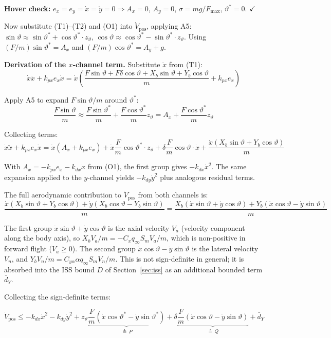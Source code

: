 \documentclass[11pt,a4paper]{article}
\theoremstyle{plain}
\theoremstyle{remark}
\newcommand{\vth}{\vartheta}
\newcommand{\vths}{\vartheta^*}
\newcommand{\zth}{z_{\vth}}
\newcommand{\Fmax}{F_{\max}}
\begin{document}
\textbf{Hover check:} $e_x = e_y = \dot x = \dot y = 0 \Rightarrow A_x = 0$, $A_y = 0$, $\sigma = mg/\Fmax$, $\vths = 0$. $\checkmark$

Now substitute (T1)--(T2) and (O1) into $\dot V_{\mathrm{pos}}$, applying A5: $\sin\vth \approx \sin\vths + \cos\vths\cdot \zth$, $\cos\vth \approx \cos\vths - \sin\vths\cdot \zth$. Using $(F/m)\sin\vths = A_x$ and $(F/m)\cos\vths = A_y + g$.

\textbf{Derivation of the $x$-channel term.} Substitute $\ddot x$ from (T1):
\[
  \dot x\ddot x + k_{px}e_x\dot x = \dot x\!\left(\frac{F\sin\vth + F\delta\cos\vth + X_b\sin\vth + Y_b\cos\vth}{m} + k_{px}e_x\right)
\]

Apply A5 to expand $F\sin\vth/m$ around $\vths$:
\[
  \frac{F\sin\vth}{m} \approx \frac{F\sin\vths}{m} + \frac{F\cos\vths}{m}\zth = A_x + \frac{F\cos\vths}{m}\zth
\]

Collecting terms:
\[
  \dot x\ddot x + k_{px}e_x\dot x = \dot x(A_x + k_{px}e_x) + \dot x\frac{F}{m}\cos\vths\cdot \zth + \delta\frac{F}{m}\cos\vth\cdot\dot x + \frac{\dot x(X_b\sin\vth + Y_b\cos\vth)}{m}
\]

With $A_x = -k_{px}e_x - k_{dx}\dot x$ from (O1), the first group gives $-k_{dx}\dot x^2$. The same expansion applied to the $y$-channel yields $-k_{dy}\dot y^2$ plus analogous residual terms.

The full aerodynamic contribution to $\dot V_{\mathrm{pos}}$ from both channels is:
\[
  \frac{\dot x(X_b\sin\vth + Y_b\cos\vth) + \dot y(X_b\cos\vth - Y_b\sin\vth)}{m}
  = \frac{X_b(\dot x\sin\vth + \dot y\cos\vth) + Y_b(\dot x\cos\vth - \dot y\sin\vth)}{m}
\]

The first group $\dot x\sin\vth + \dot y\cos\vth$ is the axial velocity $V_a$ (velocity component along the body axis), so $X_b V_a/m = -C_x q_\infty S_m V_a / m$, which is non-positive in forward flight ($V_a \geq 0$). The second group $\dot x\cos\vth - \dot y\sin\vth$ is the lateral velocity $V_n$, and $Y_b V_n/m = C_{y\alpha}\alpha q_\infty S_m V_n/m$. This is not sign-definite in general; it is absorbed into the ISS bound $D$ of Section~\ref{sec:iss} as an additional bounded term $\bar{d}_Y$.

Collecting the sign-definite terms:

\begin{equation}
  \dot V_{\mathrm{pos}} \leq -k_{dx}\dot x^2 - k_{dy}\dot y^2
  + \zth \underbrace{\frac{F}{m}(\dot x\cos\vths - \dot y\sin\vths)}_{\triangleq\, P}
  + \delta \underbrace{\frac{F}{m}(\dot x\cos\vth - \dot y\sin\vth)}_{\triangleq\, Q}
  + \bar{d}_Y
  \tag{DV1}
\end{equation}
\end{document}
